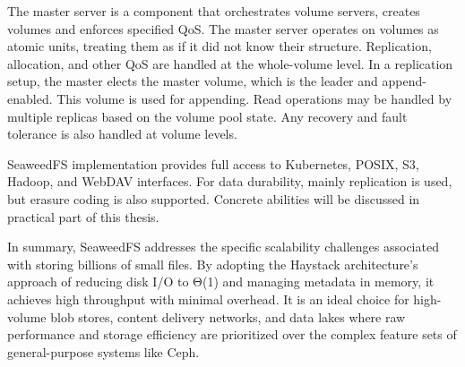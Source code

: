 The master server is a component that orchestrates volume servers, creates volumes and enforces specified QoS. The master server operates on volumes as atomic units, treating them as if it did not know their structure. Replication, allocation, and other QoS are handled at the whole-volume level. In a replication setup, the master elects the master volume, which is the leader and append-enabled. This volume is used for appending. Read operations may be handled by multiple replicas based on the volume pool state. Any recovery and fault tolerance is also handled at volume levels. \cite{seaweedfs_seaweedfs_2024}

SeaweedFS implementation provides full access to Kubernetes, POSIX, S3, Hadoop, and WebDAV interfaces. For data durability, mainly replication is used, but erasure coding is also supported. Concrete abilities will be discussed in practical part of this thesis. \cite{seaweedfs_seaweedfs_2024}

\vspace{1.5em}
In summary, SeaweedFS addresses the specific scalability challenges associated with storing billions of small files. By adopting the Haystack architecture's approach of reducing disk I/O to Θ(1) and managing metadata in memory, it achieves high throughput with minimal overhead. It is an ideal choice for high-volume blob stores, content delivery networks, and data lakes where raw performance and storage efficiency are prioritized over the complex feature sets of general-purpose systems like Ceph.
